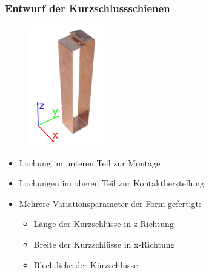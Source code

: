 \documentclass[accentcolor=tud9b, colorbacktitle, inverttitle]{tudbeamer}
\begin{document}
\begin{frame}\frametitle{Entwurf der Kurzschlussschienen}
\vspace{-1em}
\begin{multicols}{2}
	\begin{figure}[h]
		\centering
		\includegraphics[width=0.3\textwidth]{KS}
	\end{figure}
	\vfill\null
	\columnbreak
	\begin{itemize}
		\item Lochung im unteren Teil zur Montage
		\item Lochungen im oberen Teil zur Kontaktherstellung
		\item Mehrere Variationsparameter der Form gefertigt:
		\begin{itemize}
			\item L\"ange der Kurzschl\"usse in z-Richtung
			\item Breite der Kurzschl\"usse in x-Richtung
			\item Blechdicke der K\"urzschl\"usse
		\end{itemize}
	\end{itemize}
	\vfill\null
\end{multicols}
\end{frame}


\end{document}
